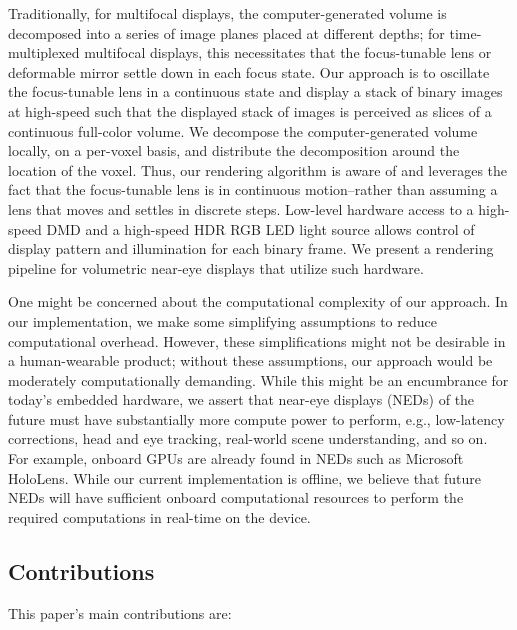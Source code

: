 Traditionally, for multifocal displays, the computer-generated volume is decomposed into a series of image planes placed at different depths; for time-multiplexed multifocal displays, this necessitates that the focus-tunable lens or deformable mirror settle down in each focus state. Our approach is to oscillate the focus-tunable lens in a continuous state and display a stack of binary images at high-speed such that the displayed stack of images is perceived as slices of a continuous full-color volume. We decompose the computer-generated volume locally, on a per-voxel basis, and distribute the decomposition around the location of the voxel. Thus, our rendering algorithm is aware of and leverages the fact that the focus-tunable lens is in continuous motion--rather than assuming a lens that moves and settles in discrete steps. Low-level hardware access to a high-speed DMD and a high-speed HDR RGB LED light source allows control of display pattern and illumination for each binary frame. We present a rendering pipeline for volumetric near-eye displays that utilize such hardware.

One might be concerned about the computational complexity of our approach. In our implementation, we make some simplifying assumptions to reduce computational overhead. However, these simplifications might not be desirable in a human-wearable product; without these assumptions, our approach would be moderately computationally demanding. While this might be an encumbrance for today's embedded hardware, we assert that near-eye displays (NEDs) of the future must have substantially more compute power to perform, e.g., low-latency corrections, head and eye tracking, real-world scene understanding, and so on. For example, onboard GPUs are already found in NEDs such as Microsoft HoloLens. While our current implementation is offline, we believe that future NEDs will have sufficient onboard computational resources to perform the required computations in real-time on the device.  
% 
% 
% 

\subsection{Contributions}
\label{sec:Contributions}
This paper's main contributions are: 

